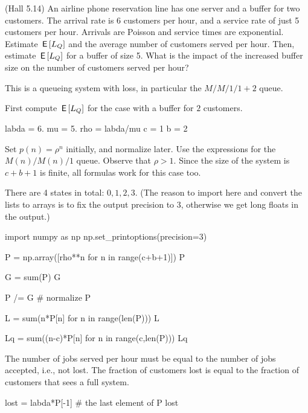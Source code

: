\begin{exercise}
  (Hall 5.14) An airline phone reservation line has one server and a
  buffer for two customers. The arrival rate is 6 customers per hour, and
  a service rate of just 5 customers per hour. Arrivals are Poisson and service times are exponential. 
 Estimate $\,\mathsf{E}\left[L_Q\right]$ and the average number of customers served per hour. Then, estimate $\,\mathsf{E}\left[L_Q\right]$ for a buffer of size 5. What is the impact of the increased buffer size on the number of customers served per hour?
  \begin{hint}
This is a queueing system with loss, in particular the $M/M/1/1+2$ queue.
  \end{hint}
    \begin{solution}
First compute $\,\mathsf{E}\left[L_Q\right]$ for the case with a buffer for $2$ customers.

\begin{pyconsole}
labda = 6.
mu = 5.
rho = labda/mu
c = 1
b = 2
\end{pyconsole} 

Set $p(n) = \rho^n$ initially, and normalize later. Use the
expressions for the $M(n)/M(n)/1$ queue.  Observe that $\rho>1$. Since
the size of the system is $c+b+1$ is finite, all formulas work for
this case too.


There are 4 states in total: $0,1,2,3$. (The reason to import  here and convert the lists to arrays is to fix the output precision to 3, otherwise we get long floats in the output.)

\begin{pyconsole}
import numpy as np
np.set_printoptions(precision=3)

P = np.array([rho**n for n in range(c+b+1)])
P

G = sum(P)
G

P /= G # normalize
P
\end{pyconsole} 

\begin{pyconsole}
L = sum(n*P[n] for n in range(len(P)))
L

Lq = sum((n-c)*P[n] for n in range(c,len(P)))
Lq
\end{pyconsole} 


The number of jobs served per hour must be equal to the number of jobs
accepted, i.e., not lost. The fraction of customers lost is equal to
the fraction of customers that sees a full system.

\begin{pyconsole}
lost = labda*P[-1] # the last element of P
lost


\end{pyconsole}
\end{solution}
\end{exercise}

